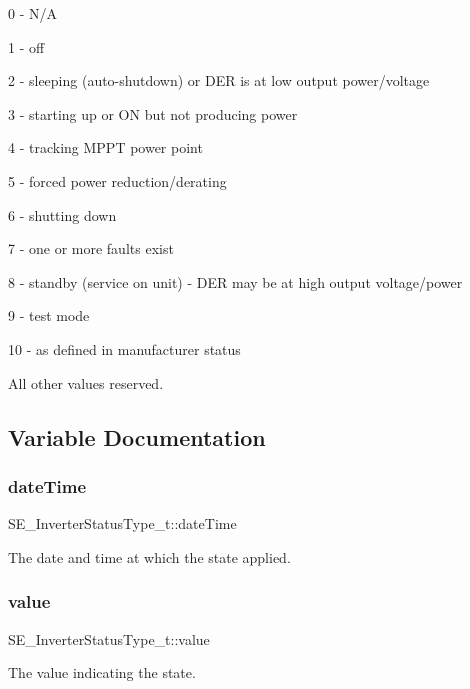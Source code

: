 0 -\/ N/A

1 -\/ off

2 -\/ sleeping (auto-\/shutdown) or D\+ER is at low output power/voltage

3 -\/ starting up or ON but not producing power

4 -\/ tracking M\+P\+PT power point

5 -\/ forced power reduction/derating

6 -\/ shutting down

7 -\/ one or more faults exist

8 -\/ standby (service on unit) -\/ D\+ER may be at high output voltage/power

9 -\/ test mode

10 -\/ as defined in manufacturer status

All other values reserved. 

\subsection{Variable Documentation}
\mbox{\label{group__InverterStatusType_ga87657492474108fe3e58f3e8ac2a5e8d}} 
\subsubsection{\texorpdfstring{date\+Time}{dateTime}}
{\footnotesize\ttfamily S\+E\+\_\+\+Inverter\+Status\+Type\+\_\+t\+::date\+Time}

The date and time at which the state applied. \mbox{\label{group__InverterStatusType_ga2e5ea03a4944948d5ab06b26e1be0bd3}} 
\subsubsection{\texorpdfstring{value}{value}}
{\footnotesize\ttfamily S\+E\+\_\+\+Inverter\+Status\+Type\+\_\+t\+::value}

The value indicating the state. 
